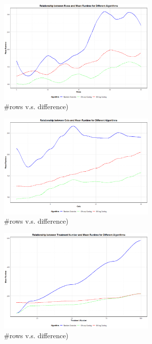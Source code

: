 \documentclass[
  a4paper,
  oneside,
  openany,
  12pt,
  onecolumn]{book}
\theoremstyle{definition}
\theoremstyle{plain}
\theoremstyle{remark}
\begin{document}
\begin{figure}[H]

{\centering \includegraphics[width=0.7\textwidth,height=\textheight]{images/Rplots/means/r-vs-t.png}

}

\caption{\#rows v.s. difference)}

\end{figure}%
\begin{figure}[H]

{\centering \includegraphics[width=0.7\textwidth,height=\textheight]{images/Rplots/means/c-vs-t.png}

}

\caption{\#rows v.s. difference)}

\end{figure}%
\begin{figure}[H]

{\centering \includegraphics[width=0.7\textwidth,height=\textheight]{images/Rplots/means/trt-vs-t.png}

}

\caption{\#rows v.s. difference)}

\end{figure}%
\end{document}
